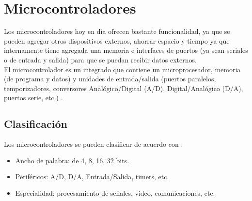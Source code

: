 %
\section{Microcontroladores} 
Los microcontroladores hoy en día ofrecen bastante funcionalidad, ya que se 
pueden agregar otros dispositivos externos, ahorrar espacio y tiempo ya que 
internamente tiene agregada una memoria e interfaces de puertos (ya sean 
seriales o de entrada y salida) para que se puedan recibir datos externos. \\
El microcontrolador es un integrado que contiene un microprocesador, memoria (de 
programa y datos) y unidades de entrada/salida (puertos paralelos, 
temporizadores, conversores Analógico/Digital (A/D), Digital/Analógico (D/A), 
puertos serie, etc.) \cite{comparativa_micros}.

%
\subsection{Clasificación}
Los microcontroladores se pueden clasificar de acuerdo con 
\cite{comparativa_micros}:

\begin{itemize}
	\item Ancho de palabra: de 4, 8, 16, 32 bits.
	\item Periféricos: A/D, D/A, Entrada/Salida,
		timers, etc.
	\item Especialidad: procesamiento de señales, video, comunicaciones, 
		etc.
\end{itemize}

%
